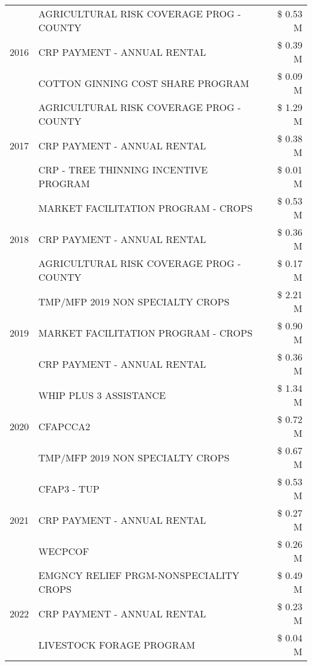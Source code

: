 \begin{tabular}{llr}
\cline{1-3}
\multirow[t]{3}{*}{2016} & AGRICULTURAL RISK COVERAGE PROG - COUNTY & \$ 0.53 M \\
 & CRP PAYMENT - ANNUAL RENTAL & \$ 0.39 M \\
 & COTTON GINNING COST SHARE PROGRAM & \$ 0.09 M \\
\cline{1-3}
\multirow[t]{3}{*}{2017} & AGRICULTURAL RISK COVERAGE PROG - COUNTY & \$ 1.29 M \\
 & CRP PAYMENT - ANNUAL RENTAL & \$ 0.38 M \\
 & CRP - TREE THINNING INCENTIVE PROGRAM & \$ 0.01 M \\
\cline{1-3}
\multirow[t]{3}{*}{2018} & MARKET FACILITATION PROGRAM - CROPS & \$ 0.53 M \\
 & CRP PAYMENT - ANNUAL RENTAL & \$ 0.36 M \\
 & AGRICULTURAL RISK COVERAGE PROG - COUNTY & \$ 0.17 M \\
\cline{1-3}
\multirow[t]{3}{*}{2019} & TMP/MFP 2019 NON SPECIALTY CROPS & \$ 2.21 M \\
 & MARKET FACILITATION PROGRAM - CROPS & \$ 0.90 M \\
 & CRP PAYMENT - ANNUAL RENTAL & \$ 0.36 M \\
\cline{1-3}
\multirow[t]{3}{*}{2020} & WHIP PLUS 3 ASSISTANCE & \$ 1.34 M \\
 & CFAPCCA2 & \$ 0.72 M \\
 & TMP/MFP 2019 NON SPECIALTY CROPS & \$ 0.67 M \\
\cline{1-3}
\multirow[t]{3}{*}{2021} & CFAP3 - TUP & \$ 0.53 M \\
 & CRP PAYMENT - ANNUAL RENTAL & \$ 0.27 M \\
 & WECPCOF & \$ 0.26 M \\
\cline{1-3}
\multirow[t]{3}{*}{2022} & EMGNCY RELIEF PRGM-NONSPECIALITY CROPS & \$ 0.49 M \\
 & CRP PAYMENT - ANNUAL RENTAL & \$ 0.23 M \\
 & LIVESTOCK FORAGE PROGRAM & \$ 0.04 M \\
\cline{1-3}
\bottomrule
\end{tabular}
